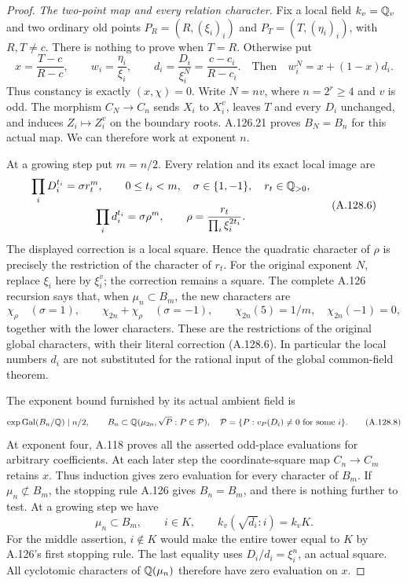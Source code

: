 \begin{proof}
\emph{The two-point map and every relation character.}
Fix a local field $k_v=\mathbb Q_v$ and two ordinary old points
$P_R=(R,(\xi_i)_i)$ and $P_T=(T,(\eta_i)_i)$, with
$R,T\ne c$.
There is nothing to prove when $T=R$.
Otherwise put
\[
 x=\frac{T-c}{R-c},\qquad w_i=\frac{\eta_i}{\xi_i},
       \qquad d_i=\frac{D_i}{\xi_i^N}=\frac{c-c_i}{R-c_i}.
 \quad\text{Then}\quad
                     w_i^N=x+(1-x)d_i.
\tag{A.128.5}
\]
Thus constancy is exactly $(x,\chi)=0$.
Write $N=nv$, where $n=2^r\ge4$ and $v$ is odd.
The morphism $C_N\to C_n$ sends $X_i$ to $X_i^v$,
leaves $T$ and every $D_i$ unchanged, and induces
$Z_i\mapsto Z_i^v$ on the boundary roots.
A.126.21 proves $B_N=B_n$ for this actual map.
We can therefore work at exponent $n$.

At a growing step put $m=n/2$.
Every relation and its exact local image are
\[
 \begin{gathered}
 \prod_iD_i^{t_i}=\sigma r_t^m,\qquad
   0\le t_i<m,\quad \sigma\in\{1,-1\},\quad r_t\in\mathbb Q_{>0},\\
 \prod_id_i^{t_i}=\sigma\rho^m,\qquad
             \rho=\frac{r_t}{\prod_i\xi_i^{2t_i}}.
 \end{gathered}
\tag{A.128.6}
\]
The displayed correction is a local square.
Hence the quadratic character of $\rho$ is precisely the
restriction of the character of $r_t$.
For the original exponent $N$, replace $\xi_i$ here by
$\xi_i^v$; the correction remains a square.
The complete A.126 recursion says that, when
$\mu_n\subset B_m$, the new characters are
\[
        \chi_\rho\quad(\sigma=1),\qquad
        \chi_{2n}+\chi_\rho\quad(\sigma=-1),
       \qquad \chi_{2n}(5)=1/m,\quad\chi_{2n}(-1)=0,
\tag{A.128.7}
\]
together with the lower characters.
These are the restrictions of the original global characters,
with their literal correction (A.128.6).
In particular the local numbers $d_i$ are not substituted
for the rational input of the global common-field theorem.

The exponent bound furnished by its actual ambient field is
\[
          \operatorname{exp}\operatorname{Gal}(B_n/\mathbb Q)\mid n/2,
       \qquad B_n\subset\mathbb Q(\mu_{2n},\sqrt P:P\in\mathcal P),
       \quad
       \mathcal P=\{P:v_P(D_i)\ne0\text{ for some }i\}.
\tag{A.128.8}
\]
At exponent four, A.118 proves all the asserted odd-place
evaluations for arbitrary coefficients.
At each later step the coordinate-square map
$C_n\to C_m$ retains $x$.
Thus induction gives zero evaluation for every character
of $B_m$.
If $\mu_n\not\subset B_m$, the stopping rule A.126 gives
$B_n=B_m$, and there is nothing further to test.
At a growing step we have
\[
              \mu_n\subset B_m,\qquad
              i\in K,\qquad
              k_v(\sqrt{d_i}:i)=k_vK.
\tag{A.128.9}
\]
For the middle assertion, $i\notin K$ would make the
entire tower equal to $K$ by A.126's first stopping rule.
The last equality uses $D_i/d_i=\xi_i^n$, an actual square.
All cyclotomic characters of $\mathbb Q(\mu_n)$ therefore have
zero evaluation on $x$.


\end{proof}
